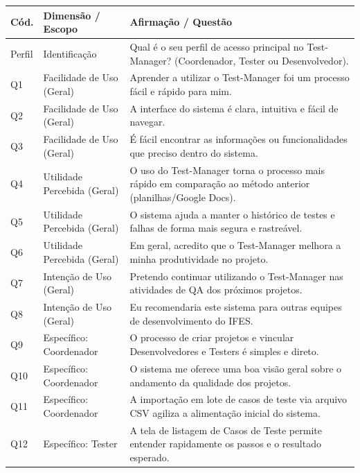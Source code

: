 \begin{quadro}[!htb]
\centering
\caption{Itens do formulário de avaliação do sistema Test-Manager.}
\label{quad:itens_questionario}
\footnotesize
\begin{tabularx}{\textwidth}{|p{1.1cm}|p{3.3cm}|X|}
\hline
\textbf{Cód.} & \textbf{Dimensão / Escopo} & \textbf{Afirmação / Questão} \\ \hline
Perfil & Identificação & Qual é o seu perfil de acesso principal no Test-Manager? (Coordenador, Tester ou Desenvolvedor). \\ \hline
Q1 & Facilidade de Uso (Geral) & Aprender a utilizar o Test-Manager foi um processo fácil e rápido para mim. \\ \hline
Q2 & Facilidade de Uso (Geral) & A interface do sistema é clara, intuitiva e fácil de navegar. \\ \hline
Q3 & Facilidade de Uso (Geral) & É fácil encontrar as informações ou funcionalidades que preciso dentro do sistema. \\ \hline
Q4 & Utilidade Percebida (Geral) & O uso do Test-Manager torna o processo mais rápido em comparação ao método anterior (planilhas/Google Docs). \\ \hline
Q5 & Utilidade Percebida (Geral) & O sistema ajuda a manter o histórico de testes e falhas de forma mais segura e rastreável. \\ \hline
Q6 & Utilidade Percebida (Geral) & Em geral, acredito que o Test-Manager melhora a minha produtividade no projeto. \\ \hline
Q7 & Intenção de Uso (Geral) & Pretendo continuar utilizando o Test-Manager nas atividades de QA dos próximos projetos. \\ \hline
Q8 & Intenção de Uso (Geral) & Eu recomendaria este sistema para outras equipes de desenvolvimento do IFES. \\ \hline
Q9 & Específico: Coordenador & O processo de criar projetos e vincular Desenvolvedores e Testers é simples e direto. \\ \hline
Q10 & Específico: Coordenador & O sistema me oferece uma boa visão geral sobre o andamento da qualidade dos projetos. \\ \hline
Q11 & Específico: Coordenador & A importação em lote de casos de teste via arquivo CSV agiliza a alimentação inicial do sistema. \\ \hline
Q12 & Específico: Tester & A tela de listagem de Casos de Teste permite entender rapidamente os passos e o resultado esperado. \\ \hline

\end{tabularx}
\end{quadro}
